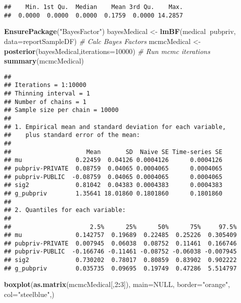 \documentclass[]{article}
\newenvironment{Shaded}{\begin{snugshade}}{\end{snugshade}}
\newcommand{\CommentTok}[1]{\textcolor[rgb]{0.56,0.35,0.01}{\textit{#1}}}
\newcommand{\DataTypeTok}[1]{\textcolor[rgb]{0.13,0.29,0.53}{#1}}
\newcommand{\DecValTok}[1]{\textcolor[rgb]{0.00,0.00,0.81}{#1}}
\newcommand{\KeywordTok}[1]{\textcolor[rgb]{0.13,0.29,0.53}{\textbf{#1}}}
\newcommand{\NormalTok}[1]{#1}
\newcommand{\OperatorTok}[1]{\textcolor[rgb]{0.81,0.36,0.00}{\textbf{#1}}}
\newcommand{\OtherTok}[1]{\textcolor[rgb]{0.56,0.35,0.01}{#1}}
\newcommand{\StringTok}[1]{\textcolor[rgb]{0.31,0.60,0.02}{#1}}
\begin{document}
\begin{Shaded}
\end{Shaded}

\begin{verbatim}
##    Min. 1st Qu.  Median    Mean 3rd Qu.    Max. 
##  0.0000  0.0000  0.0000  0.1759  0.0000 14.2857
\end{verbatim}

\begin{Shaded}
\begin{Highlighting}[]
\KeywordTok{EnsurePackage}\NormalTok{(}\StringTok{"BayesFactor"}\NormalTok{)}
\NormalTok{bayesMedical <-}\StringTok{ }\KeywordTok{lmBF}\NormalTok{(medical}\OperatorTok{~}\NormalTok{pubpriv, }\DataTypeTok{data=}\NormalTok{reportSampleDF) }\CommentTok{# Calc Bayes Factors}
\NormalTok{mcmcMedical <-}\StringTok{ }\KeywordTok{posterior}\NormalTok{(bayesMedical,}\DataTypeTok{iterations=}\DecValTok{10000}\NormalTok{)  }\CommentTok{# Run mcmc iterations}
\KeywordTok{summary}\NormalTok{(mcmcMedical)}
\end{Highlighting}
\end{Shaded}

\begin{verbatim}
## 
## Iterations = 1:10000
## Thinning interval = 1 
## Number of chains = 1 
## Sample size per chain = 10000 
## 
## 1. Empirical mean and standard deviation for each variable,
##    plus standard error of the mean:
## 
##                     Mean       SD  Naive SE Time-series SE
## mu               0.22459  0.04126 0.0004126      0.0004126
## pubpriv-PRIVATE  0.08759  0.04065 0.0004065      0.0004065
## pubpriv-PUBLIC  -0.08759  0.04065 0.0004065      0.0004065
## sig2             0.81042  0.04383 0.0004383      0.0004383
## g_pubpriv        1.35641 18.01860 0.1801860      0.1801860
## 
## 2. Quantiles for each variable:
## 
##                      2.5%      25%      50%      75%     97.5%
## mu               0.142757  0.19689  0.22485  0.25226  0.305409
## pubpriv-PRIVATE  0.007945  0.06038  0.08752  0.11461  0.166746
## pubpriv-PUBLIC  -0.166746 -0.11461 -0.08752 -0.06038 -0.007945
## sig2             0.730202  0.78017  0.80859  0.83902  0.902222
## g_pubpriv        0.035735  0.09695  0.19749  0.47286  5.514797
\end{verbatim}

\begin{Shaded}
\begin{Highlighting}[]
\KeywordTok{boxplot}\NormalTok{(}\KeywordTok{as.matrix}\NormalTok{(mcmcMedical[,}\DecValTok{2}\OperatorTok{:}\DecValTok{3}\NormalTok{]), }\DataTypeTok{main=}\OtherTok{NULL}\NormalTok{, }\DataTypeTok{border=}\StringTok{"orange"}\NormalTok{, }\DataTypeTok{col=}\StringTok{"steelblue"}\NormalTok{,)}
\end{Highlighting}
\end{Shaded}
\end{document}
